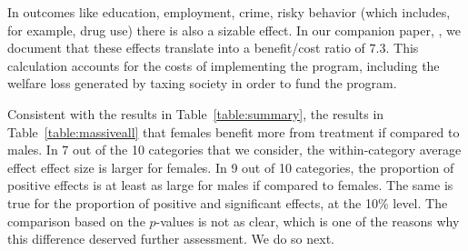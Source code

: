 In outcomes like education, employment, crime, risky behavior (which includes, for example, drug use) there is also a sizable effect. In our companion paper, \citet{Garcia_Heckman_Leaf_etal_2017_Comp_CBA_Unpublished}, we document that these effects translate into a benefit/cost ratio of $7.3$. This calculation accounts for the costs of implementing the program, including the welfare loss generated by taxing society in order to fund the program.

Consistent with the results in Table~\ref{table:summary}, the results in Table~\ref{table:massiveall} that females benefit more from treatment if compared to males. In 7 out of the 10 categories that we consider, the within-category average effect effect size is larger for females. In 9 out of 10 categories, the proportion of positive effects is at least as large for males if compared to females. The same is true for the proportion of positive and significant effects, at the 10\% level. The comparison based on the \citet{} $p$-values is not as clear, which is one of the reasons why this difference deserved further assessment. We do so next.


